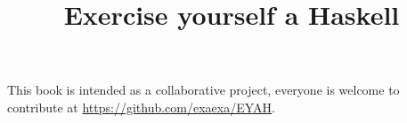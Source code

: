 \documentclass[10pt,a5paper]{book}
\title{Exercise yourself a Haskell}
\date{}
\begin{document}
\maketitle
This book is intended as a collaborative project, everyone is welcome to
contribute at \url{https://github.com/exaexa/EYAH}.
\end{document}
